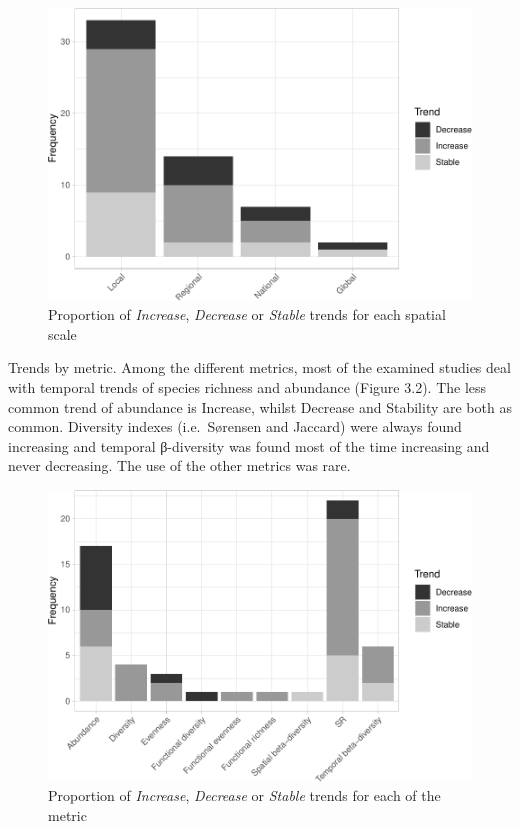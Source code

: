 \documentclass[
  12pt,
  oneside]{report}
\begin{document}
\begin{figure}
\centering
\includegraphics{literature_review_files/figure-latex/barspatscale-1.pdf}
\caption{\label{fig:barspatscale}Proportion of \emph{Increase}, \emph{Decrease} or \emph{Stable} trends for each spatial scale}
\end{figure}

Trends by metric. Among the different metrics, most of the examined studies deal with temporal trends of species richness and abundance (Figure 3.2). The less common trend of abundance is Increase, whilst Decrease and Stability are both as common. Diversity indexes (i.e.~Sørensen and Jaccard) were always found increasing and temporal β-diversity was found most of the time increasing and never decreasing. The use of the other metrics was rare.

\begin{figure}
\centering
\includegraphics{literature_review_files/figure-latex/barmetrics-1.pdf}
\caption{\label{fig:barmetrics}Proportion of \emph{Increase}, \emph{Decrease} or \emph{Stable} trends for each of the metric}
\end{figure}
\end{document}
